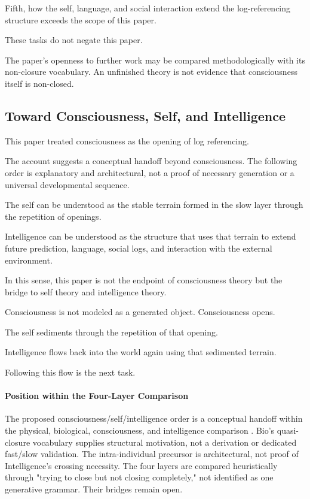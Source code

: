 Fifth, how the self, language, and social interaction extend the log-referencing structure exceeds the scope of this paper.

These tasks do not negate this paper.

The paper's openness to further work may be compared methodologically with its non-closure vocabulary. An unfinished theory is not evidence that consciousness itself is non-closed.

\subsection{Toward Consciousness, Self, and Intelligence}


This paper treated consciousness as the opening of log referencing.

The account suggests a conceptual handoff beyond consciousness. The following order is explanatory and architectural, not a proof of necessary generation or a universal developmental sequence.

The self can be understood as the stable terrain formed in the slow layer through the repetition of openings.

Intelligence can be understood as the structure that uses that terrain to extend future prediction, language, social logs, and interaction with the external environment.

In this sense, this paper is not the endpoint of consciousness theory but the bridge to self theory and intelligence theory.

Consciousness is not modeled as a generated object. Consciousness opens.

The self sediments through the repetition of that opening.

Intelligence flows back into the world again using that sedimented terrain.

Following this flow is the next task.

\paragraph{Position within the Four-Layer Comparison}
The proposed consciousness/self/intelligence order is a conceptual handoff
within the physical, biological, consciousness, and intelligence comparison
\cite{Intelligence}. Bio's quasi-closure vocabulary supplies structural
motivation, not a derivation or dedicated fast/slow validation. The
intra-individual precursor is architectural, not proof of Intelligence's
crossing necessity. The four layers are compared heuristically through
"trying to close but not closing completely," not identified as one
generative grammar. Their bridges remain open.

